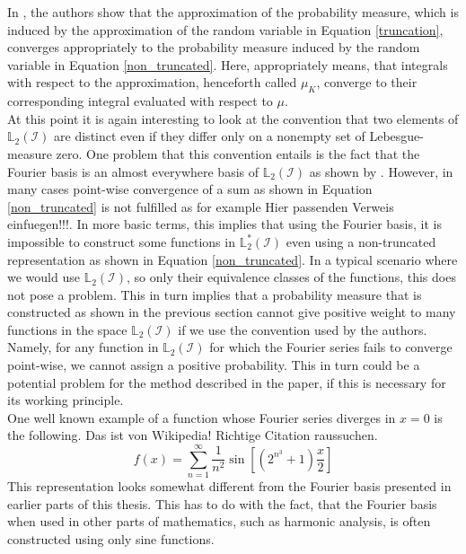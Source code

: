 \documentclass[12pt, a4paper]{article}
\theoremstyle{MAstyle} \newtheorem{assumption}{Assumption}[section]
\theoremstyle{MAstyle} \newtheorem{definition}{Definition}[section]
\theoremstyle{MAstyle} \newtheorem{theorem}{Theorem}[section]
\begin{document}
			In \cite{bugni_goodness--fit_2009}, the authors show that the approximation of the probability measure, which is induced by the approximation of the random variable in Equation \ref{truncation}, converges appropriately to the probability measure induced by the random variable in Equation \ref{non_truncated}. Here, appropriately means, that integrals with respect to the approximation, henceforth called $\mu_K$, converge to their corresponding integral evaluated with respect to $\mu$.\\
			
			At this point it is again interesting to look at the convention that two elements of $\mathbb{L}_2(\mathcal{I})$ are distinct even if they differ only on a nonempty set of Lebesgue-measure zero. One problem that this convention entails is the fact that the Fourier basis is an almost everywhere basis of $\mathbb{L}_2\left(\mathcal{I}\right)$ as shown by \cite{carleson_convergence_1966}. However, in many cases point-wise convergence of a sum as shown in Equation \ref{non_truncated} is not fulfilled as for example {\color{red} Hier passenden Verweis einfuegen!!!}. In more basic terms, this implies that using the Fourier basis, it is impossible to construct some functions in $\mathbb{L}^{*}_2\left(\mathcal{I}\right)$ even using a non-truncated representation as shown in Equation \ref{non_truncated}.			
			In a typical scenario where we would use $\mathbb{L}_2\left(\mathcal{I}\right)$, so only their equivalence classes of the functions, this does not pose a problem. 
			This in turn implies that a probability measure that is constructed as shown in the previous section cannot give positive weight to many functions in the space $\mathbb{L}_2(\mathcal{I})$ if we use the convention used by the authors. Namely, for any function in $\mathbb{L}_2(\mathcal{I})$ for which the Fourier series fails to converge point-wise, we cannot assign a positive probability. This in turn could be a potential problem for the method described in the paper, if this is necessary for its working principle.\\
			
			One well known example of a function whose Fourier series diverges in $x=0$ is the following. {\color{red} Das ist von Wikipedia! Richtige Citation raussuchen.}
			\begin{equation}
				f(x) = \sum_{n = 1}^{\infty} \frac{1}{n^2}\sin\left[\left(2^{n^3} + 1\right)\frac{x}{2}\right]
			\end{equation}
			This representation looks somewhat different from the Fourier basis presented in earlier parts of this thesis. This has to do with the fact, that the Fourier basis when used in other parts of mathematics, such as harmonic analysis, is often constructed using only sine functions.
			
\end{document}
